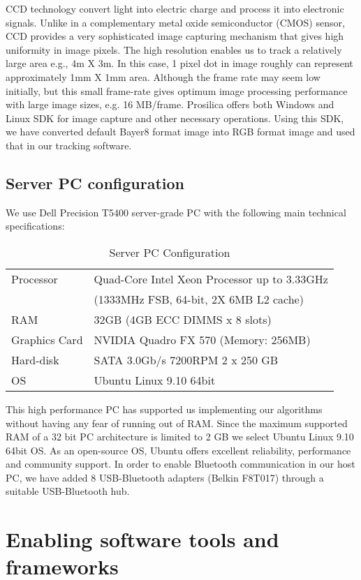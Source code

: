 CCD technology convert light into electric charge and process it into electronic signals. Unlike in a complementary metal oxide semiconductor (CMOS) sensor,  CCD provides a very sophisticated image capturing mechanism that gives high uniformity in image pixels. The high resolution enables us to track a relatively large area e.g., 4m X 3m. In this case, 1 pixel dot in image roughly can represent approximately 1mm X 1mm area. Although the frame rate may seem low initially,  but this small frame-rate gives optimum image processing performance with large image sizes, e.g. 16 MB/frame. Prosilica offers both Windows and Linux SDK for image capture and other necessary operations. Using this SDK, we have converted default Bayer8 format image into RGB format  image and used that in our tracking software.
\subsection{Server PC configuration}
We use Dell  Precision T5400 server-grade PC with the following main technical specifications:
\begin{table}
\caption{Server PC Configuration}
\label{table:server-pc}
\begin{center}
\begin{tabular}{|l||l|}
\hline Processor & Quad-Core Intel Xeon Processor up to 3.33GHz\\ 
& (1333MHz FSB, 64-bit, 2X 6MB L2 cache)\\
\hline RAM & 32GB (4GB ECC DIMMS x 8 slots)\\
\hline Graphics Card & NVIDIA Quadro FX 570 (Memory: 256MB)\\
\hline Hard-disk &  SATA 3.0Gb/s 7200RPM  2 x 250 GB\\
\hline OS & Ubuntu Linux 9.10 64bit\\
\hline
\end{tabular}
\end{center}
\end{table}
This high performance PC has supported us implementing our algorithms without having any fear of running out of RAM.  Since the maximum supported RAM of a 32 bit PC architecture is limited to 2 GB we select Ubuntu Linux 9.10 64bit OS.  As an open-source OS,  Ubuntu offers excellent reliability, performance and community support. In order to enable Bluetooth communication in our host PC, we have added 8 USB-Bluetooth adapters (Belkin F8T017) through a suitable USB-Bluetooth hub. 
\section{Enabling software tools and frameworks}
